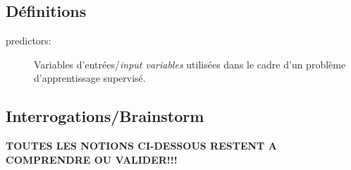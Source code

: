\documentclass{article}
\begin{document}
\subsection*{Définitions}

\begin{description}
\item [predictors:] Variables d'entrées/\emph{input variables} utilisées dans le
  cadre d'un problème d'apprentissage supervisé.
\end{description}

\subsection*{Interrogations/Brainstorm}
\textbf{TOUTES LES NOTIONS CI-DESSOUS RESTENT A COMPRENDRE OU VALIDER!!!}
\end{document}
